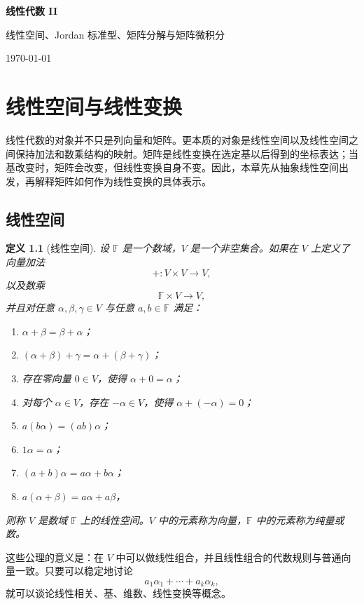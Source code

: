 \documentclass[UTF8,openany,zihao=-4]{ctexbook}
\theoremstyle{cnplain}
\newtheorem{definition}{定义}[chapter]
\newcommand{\F}{\mathbb F}
\begin{document}
\begin{titlepage}
  \centering
  \vspace*{4cm}
  {\Huge\bfseries 线性代数 II\par}
  \vspace{0.8cm}
  {\Large 线性空间、Jordan 标准型、矩阵分解与矩阵微积分\par}
  \vfill
  {\large \today\par}
\end{titlepage}

\tableofcontents
\clearpage

\chapter{线性空间与线性变换}

线性代数的对象并不只是列向量和矩阵。更本质的对象是线性空间以及线性空间之间保持加法和数乘结构的映射。矩阵是线性变换在选定基以后得到的坐标表达；当基改变时，矩阵会改变，但线性变换自身不变。因此，本章先从抽象线性空间出发，再解释矩阵如何作为线性变换的具体表示。

\section{线性空间}

\begin{definition}[线性空间]
设 $\F$ 是一个数域，$V$ 是一个非空集合。如果在 $V$ 上定义了向量加法
\[
+:V\times V\to V,
\]
以及数乘
\[
\F\times V\to V,
\]
并且对任意 $\alpha,\beta,\gamma\in V$ 与任意 $a,b\in\F$ 满足：
\begin{enumerate}
  \item $\alpha+\beta=\beta+\alpha$；
  \item $(\alpha+\beta)+\gamma=\alpha+(\beta+\gamma)$；
  \item 存在零向量 $0\in V$，使得 $\alpha+0=\alpha$；
  \item 对每个 $\alpha\in V$，存在 $-\alpha\in V$，使得 $\alpha+(-\alpha)=0$；
  \item $a(b\alpha)=(ab)\alpha$；
  \item $1\alpha=\alpha$；
  \item $(a+b)\alpha=a\alpha+b\alpha$；
  \item $a(\alpha+\beta)=a\alpha+a\beta$，
\end{enumerate}
则称 $V$ 是数域 $\F$ 上的线性空间。$V$ 中的元素称为向量，$\F$ 中的元素称为纯量或数。
\end{definition}

这些公理的意义是：在 $V$ 中可以做线性组合，并且线性组合的代数规则与普通向量一致。只要可以稳定地讨论
\[
a_1\alpha_1+\cdots+a_k\alpha_k,
\]
就可以谈论线性相关、基、维数、线性变换等概念。
\end{document}
